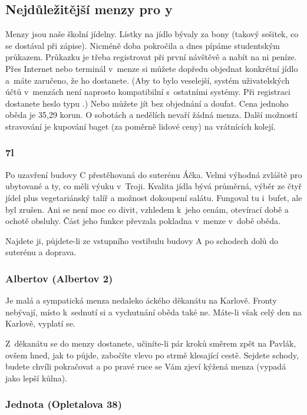 \subsection{Nejdůležitější menzy pro \mfk{}y}

Menzy jsou naše školní jídelny. Lístky na jídlo bývaly za bony
(takový sešitek, co se dostával při zápise). Nicméně doba
pokročila a dnes pípáme studentským průkazem. Průkazku je třeba
registrovat při první návštěvě a nabít na ni peníze. Přes Internet
nebo terminál v~menze si můžete dopředu objednat konkrétní jídlo
a~máte zaručeno, že ho dostanete. (Aby to bylo veselejší, systém uživatelských účtů v~menzách není naprosto kompatibilní s~ostatními systémy. Při registraci dostanete heslo typu .) Nebo můžete jít bez objednání
 a doufat. Cena jednoho oběda je 35,29 korun.
O sobotách a nedělích nevaří žádná menza. Další možností
stravování je kupování baget (za poměrně lidové ceny) na
vrátnících kolejí.

\subsubsection{\17l}
Po uzavření budovy C přestěhovaná do suterénu Áčka.
Velmi výhodná zvláště pro ubytované a ty, co měli výuku v~Troji.
Kvalita jídla bývá průměrná, výběr ze čtyř jídel plus
vegetariánský talíř a možnost dokoupení salátu. Fungoval tu
i~bufet, ale byl zrušen. Ani se není moc co divit, vzhledem k~jeho
cenám, otevírací době a ochotě obsluhy. Část jeho funkce převzala
pokladna v~menze v~době oběda.

Najdete ji, půjdete-li ze vstupního vestibulu budovy A po schodech dolů do suterénu a doprava.

\subsubsection{Albertov (Albertov 2)} 

Je malá a sympatická menza nedaleko
\mfz{}áckého děkanátu na Karlově. Fron\-ty nebývají, místo
k~sednutí si a vychutnání oběda také ne. Máte-li však celý den na
Karlově, vyplatí se.

Z~děkanátu se do menzy dostanete,
učiníte-li pár kroků směrem zpět na Pavlák, ovšem hned, jak to
půjde, zabočíte vlevo po strmě klesající cestě. Sejdete schody,
budete chvíli pokračovat a po pravé ruce se Vám zjeví kýžená menza
(vypadá jako lepší kůlna).

\subsubsection{Jednota (Opletalova 38)} 


